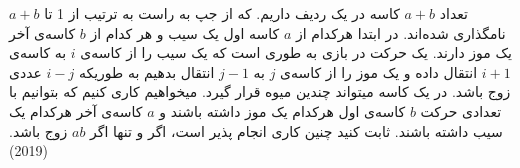 تعداد $a + b$ کاسه در یک ردیف داریم. که از جپ به راست به ترتیب از 1 تا $a + b$ نامگذاری شده‌اند.
در ابتدا هرکدام از $a$ کاسه اول یک سیب و هر کدام از $b$ کاسه‌ی آخر یک موز دارند.
یک حرکت در بازی به طوری است که یک سیب را از کاسه‌ی $i$ به کاسه‌ی $i + 1$ انتقال داده و یک موز را 
از کاسه‌ی $j$ به $j - 1$ انتقال بدهیم به طوریکه $i - j$ عددی زوج باشد.
در یک کاسه میتواند چندین میوه قرار گیرد.
میخواهیم کاری کنیم که بتوانیم با تعدادی حرکت $b$ کاسه‌ی اول هرکدام یک موز داشته باشند و $a$ 
کاسه‌ی آخر هرکدام یک سیب داشته باشند.
ثابت کنید چنین کاری انجام پذیر است، اگر و تنها اگر $ab$ زوج باشد.
(2019)